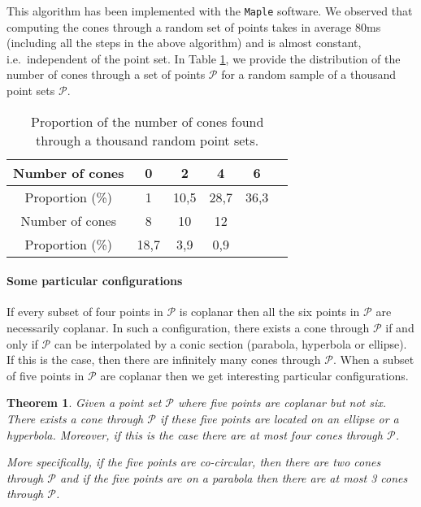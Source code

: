 \documentclass[5p]{elsarticle}
\newtheorem{thm}{Theorem}
\newcommand\Pc{\mathcal P}
\newcommand{\com}[1]{{\color{black} #1}}
\newcommand{\lb}[1]{{\color{black} #1}}
\begin{document}
This algorithm has been implemented with the {\tt Maple} software. We observed that \com{computing} the cones through a random set of points takes in average 80ms \com{(including all the steps in the above algorithm)} and is almost constant, \com{i.e.~independent} of the point set. In Table \ref{tab:cone6P}, we provide the \com{distribution} of the number of cones through a set of \com{points} $\Pc$ for a random sample of a thousand point sets $\Pc$.


\begin{table}
\begin{center}
\begin{tabular}{c|c|c|c|c|c|}
 Number of cones & 0 & 2 & 4 & 6  \\ 
	 \hline
Proportion (\%)	 &  1 & 10,5  & 28,7 & 36,3   \\ \hline \hline

 Number of cones  & 8 & 10 & 12 & \\ 
	 \hline
Proportion (\%)	  & 18,7 & 3,9 & 0,9 & \\

\hline	
\end{tabular}
\caption{Proportion of the number of cones found through a thousand random point sets.}\label{tab:cone6P}
\end{center}
\end{table}



\paragraph{Some particular configurations}\label{subsec:cone6P-particular}

If every subset of four \lb{po\-ints} in $\Pc$ is coplanar then all the six points in $\Pc$ are necessarily coplanar. In such a configuration, there exists a cone through $\Pc$ if and only if $\Pc$ can be interpolated by a conic section (parabola, hyperbola or ellipse). If this is the case, then there are infinitely many cones through $\Pc$. When a subset of five points in $\Pc$ are coplanar then we get interesting particular configurations.



\begin{thm}\label{them:4cones} \com{Given} a point set $\Pc$ where five points are coplanar but not six. \lb{There} exists a cone through $\Pc$ if these five points are located on \com{an ellipse or a hyperbola}. Moreover, if this is the \com{case there} are at most four cones through $\Pc$. 
	
	More specifically, if the five points are co-circular, then there are two cones through $\Pc$ and if \com{the five points} are on a parabola then there are at most 3 cones through $\Pc$. 
\end{thm}
\end{document}
